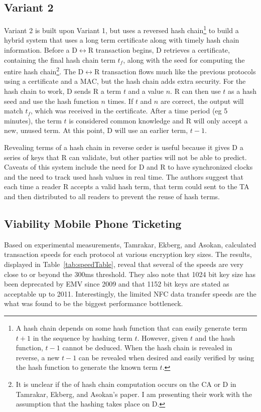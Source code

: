 \documentclass{sig-alternate}
\begin{document}
\subsection{Variant 2}
Variant 2 is built upon Variant 1, but uses a reversed hash chain\footnote{
A hash chain depends on some hash function that can easily generate term $t+1$ in the sequence by hashing term $t$. However, given $t$ and the hash function, $t-1$ cannot be deduced. When the hash chain is revealed in reverse, a new $t-1$ can be revealed when desired and easily verified by using the hash function to generate the known term $t$.
} to build a hybrid system that uses a long term certificate along with timely hash chain information. Before a D$\leftrightarrow$R transaction begins, D retrieves a certificate, containing the final hash chain term $t_{f}$, along with the seed for computing the entire hash chain\footnote{It is unclear if the of hash chain computation occurs on the CA or D in Tamrakar, Ekberg, and Asokan's paper. I am presenting their work with the assumption that the hashing takes place on D.}. 
The D$\leftrightarrow$R transaction flows much like the previous protocols using a certificate and a MAC, but the hash chain adds extra security. For the hash chain to work, D sends R a term $t$ and a value $n$. R can then use $t$ as a hash seed and use the hash function $n$ times. If $t$ and $n$ are correct, the output will match $t_{f}$, which was received in the certificate. 
After a time period (eg 5 minutes), the term $t$ is considered common knowledge and R will only accept a new, unused term. At this point, D will use an earlier term, $t-1$. 

Revealing terms of a hash chain in reverse order is useful because it gives D a series of keys that R can validate, but other parties will not be able to predict. Caveats of this system include the need for D and R to have synchronized clocks and the need to track used hash values in real time. The authors suggest that each time a reader R accepts a valid hash term, that term could sent to the TA and then distributed to all readers to prevent the reuse of hash terms. 


\subsection{Viability Mobile Phone Ticketing}
Based on experimental measurements, Tamrakar, Ekberg, and Asokan, calculated transaction speeds for each protocol at various encryption key sizes. The results, displayed in Table~\ref{tab:speedTable}, reveal that several of the speeds are very close to or beyond the 300ms threshold. They also note that 1024 bit key size has been deprecated by EMV since 2009 and that 1152 bit keys are stated as acceptable up to 2011. Interestingly, the limited NFC data transfer speeds are the what was found to be the biggest performance bottleneck. 
\end{document}
